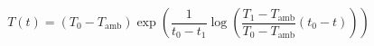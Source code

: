 \documentclass[preview]{standalone}
\begin{document}
\begin{equation*}
    T(t) = \left( T_0 - T_\mathrm{amb} \right) \exp\left( \frac{1}{t_0 - t_1}\log\left( \frac{T_1 - T_\mathrm{amb}}{T_0 - T_\mathrm{amb}}\left( t_0 - t \right) \right) \right)
\end{equation*}
\end{document}
